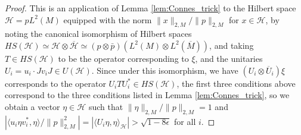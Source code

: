\documentclass[11pt]{amsart}
\newcommand{\cH}{{\mathcal{H}}}
\theoremstyle{definition}
\theoremstyle{remark}
\theoremstyle{definition}
\begin{document}
\begin{proof}
    This is  an application of Lemma \ref{lem:Connes_trick} to the Hilbert space $\cH =p L^2(M)$ equipped with the norm $\| x\|_{2,M} / \| p \|_{2,M}$ for $x \in \cH$, by noting the canonical isomorphism of Hilbert spaces $HS(\cH) \simeq \cH \otimes \overline \cH \simeq (p \otimes \bar p)(L^2(M) \otimes L^2(\overline M))$, and taking $T \in HS(\cH)$ to be the operator corresponding to $\xi$, and the unitaries $U_i = u_i \cdot J v_i J \in U(\cH)$.
    Since under this isomorphism, we have $(U_i\otimes \overline{U}_i) \xi$ corresponds to the operator $U_iTU_i^* \in HS(\cH)$, the first three conditions above correspond to the three conditions listed in Lemma \ref{lem:Connes_trick}, so we obtain a vector $\eta \in \cH$ such that $\| \eta \|_{2,M} / \|p \|_{2,M} = 1$ and $|\langle u_i \eta v_i^*, \eta \rangle / \| p \|_{2,M}^2 |= |\langle U_i\eta,\eta \rangle_\cH| > \sqrt{1- 8\epsilon}$ for all $i$. 
    

\end{proof}
\end{document}
